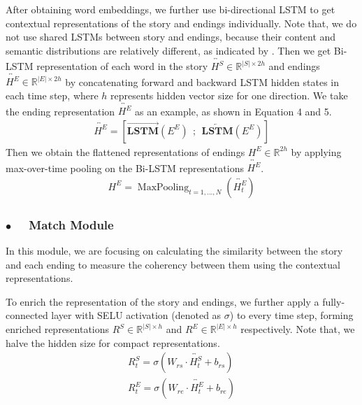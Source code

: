 \documentclass[letterpaper]{article} %
\begin{document}
After obtaining word embeddings, we further use bi-directional LSTM \cite{graves-etal-2005} to get contextual representations of the story and endings individually.
Note that, we do not use shared LSTMs between story and endings, because their content and semantic distributions are relatively different, as indicated by \citeauthor{cai-etal-2017} .
Then we get Bi-LSTM representation of each word in the story $\overleftrightarrow{H^S} \in \mathbb{R}^{|S| \times 2h}$ and endings $\overleftrightarrow{H^E}  \in \mathbb{R}^{|E| \times 2h}$ by concatenating forward and backward LSTM hidden states in each time step, where $h$ represents hidden vector size for one direction. We take the ending representation $\overleftrightarrow{H^E}$ as an example, as shown in Equation 4 and 5.
\begin{gather}
\overleftrightarrow{H^E} = [\overrightarrow{\mathbf{LSTM}}(E^E) ~~;~~ \overleftarrow{\mathbf{LSTM}}(E^E)]
\end{gather}
Then we obtain the flattened representations of endings $H^{E} \in \mathbb{R}^{2h}$ by applying max-over-time pooling on the Bi-LSTM representations $\overleftrightarrow{H^E}$.
\begin{gather}
H^{E} = \mathop{MaxPooling}_{t=1,...,N}(\overleftrightarrow{H^E_t})
\end{gather}



\subsubsection*{$\bullet$~~ Match Module}
In this module, we are focusing on calculating the similarity between the story and each ending to measure the coherency between them using the contextual representations.

To enrich the representation of the story and endings, we further apply a fully-connected layer with SELU activation (denoted as $\sigma$) \cite{klambauer-etal-2017} to every time step, forming enriched representations $R^S \in \mathbb{R}^{|S| \times h}$ and $R^E \in \mathbb{R}^{|E| \times h}$ respectively. Note that, we halve the hidden size for compact representations.
\begin{gather}
R^S_t = \sigma(W_{rs} \cdot \overleftrightarrow{H^S_t} + b_{rs}) \\
R^E_t = \sigma(W_{re} \cdot \overleftrightarrow{H^E_t} + b_{re})
\end{gather}
\end{document}
